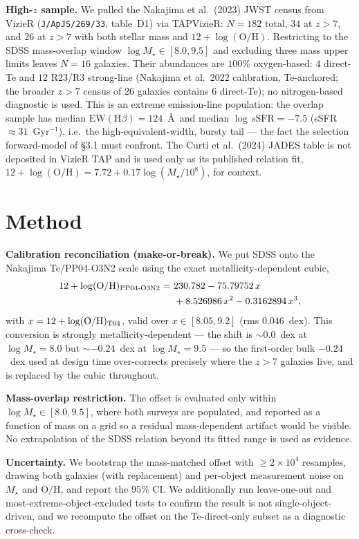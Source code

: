 \documentclass[twocolumn]{aastex631}
\begin{document}
\textbf{High-$z$ sample.} We pulled the Nakajima et al.\ (2023) JWST census from VizieR (\texttt{J/ApJS/269/33}, table~D1) via TAPVizieR: $N=182$ total, $34$ at $z>7$, and $26$ at $z>7$ with both stellar mass and $12+\log(\mathrm{O/H})$. Restricting to the SDSS mass-overlap window $\log M_\star\in[8.0,9.5]$ and excluding three mass upper limits leaves $N=16$ galaxies. Their abundances are $100\%$ oxygen-based: $4$ direct-Te and $12$ R23/R3 strong-line (Nakajima et al.\ 2022 calibration, Te-anchored; the broader $z>7$ census of $26$ galaxies contains $6$ direct-Te); no nitrogen-based diagnostic is used. This is an extreme emission-line population: the overlap sample has median $\mathrm{EW}(\mathrm{H}\beta)=124$~\AA\ and median $\log\,\mathrm{sSFR}=-7.5$ (sSFR $\approx31$~Gyr$^{-1}$), i.e.\ the high-equivalent-width, bursty tail --- the fact the selection forward-model of \S3.1 must confront. The Curti et al.\ (2024) JADES table is not deposited in VizieR TAP and is used only as its published relation fit, $12+\log(\mathrm{O/H})=7.72+0.17\log(M_\star/10^{8})$, for context.

\section{Method}
\textbf{Calibration reconciliation (make-or-break).} We put SDSS onto the Nakajima Te/PP04-O3N2 scale using the exact \citet{KewleyEllison2008} metallicity-dependent cubic,
\begin{align}
12+\log(\mathrm{O/H})_{\rm PP04\text{-}O3N2} =\ & 230.782 - 75.79752\,x \nonumber\\
 & + 8.526986\,x^2 - 0.3162894\,x^3,
\end{align}
with $x=12+\log(\mathrm{O/H})_{\rm T04}$, valid over $x\in[8.05,9.2]$ (rms $0.046$~dex). This conversion is strongly metallicity-dependent --- the shift is $\sim0.0$~dex at $\log M_\star=8.0$ but $\sim-0.24$~dex at $\log M_\star=9.5$ --- so the first-order bulk $-0.24$~dex used at design time over-corrects precisely where the $z>7$ galaxies live, and is replaced by the cubic throughout.

\textbf{Mass-overlap restriction.} The offset is evaluated only within $\log M_\star\in[8.0,9.5]$, where both surveys are populated, and reported as a function of mass on a grid so a residual mass-dependent artifact would be visible. No extrapolation of the SDSS relation beyond its fitted range is used as evidence.

\textbf{Uncertainty.} We bootstrap the mass-matched offset with $\geq2\times10^4$ resamples, drawing both galaxies (with replacement) and per-object measurement noise on $M_\star$ and $\mathrm{O/H}$, and report the $95\%$ CI. We additionally run leave-one-out and most-extreme-object-excluded tests to confirm the result is not single-object-driven, and we recompute the offset on the Te-direct-only subset as a diagnostic cross-check.
\end{document}
